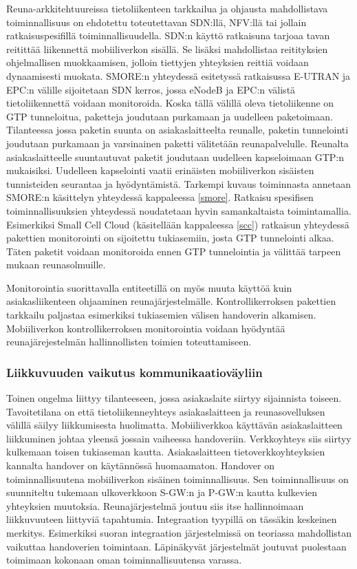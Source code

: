Reuna-arkkitehtuureissa tietoliikenteen tarkkailua ja ohjausta mahdollistava toiminnallisuus on ehdotettu toteutettavan SDN:llä, NFV:llä tai jollain ratkaisuspesifillä toiminnallisuudella. 
SDN:n käyttö ratkaisuna tarjoaa tavan reitittää liikennettä mobiiliverkon sisällä. Se lisäksi mahdollistaa reitityksien ohjelmallisen muokkaamisen, jolloin tiettyjen yhteyksien reittiä voidaan dynaamisesti muokata. SMORE:n yhteydessä esitetyssä ratkaisussa  E-UTRAN ja EPC:n välille sijoitetaan SDN kerros, jossa eNodeB ja EPC:n välistä tietoliikennettä voidaan monitoroida. 
Koska tällä välillä oleva tietoliikenne on GTP tunneloitua, paketteja joudutaan purkamaan ja uudelleen paketoimaan. 
Tilanteessa jossa paketin suunta on asiakaslaitteelta reunalle, paketin tunnelointi joudutaan purkamaan ja varsinainen paketti välitetään reunapalvelulle. 
Reunalta asiakaslaitteelle suuntautuvat paketit joudutaan uudelleen kapseloimaan GTP:n mukaisiksi.
Uudelleen kapselointi vaatii erinäisten mobiiliverkon sisäisten tunnisteiden seurantaa ja hyödyntämistä.
Tarkempi kuvaus toiminnasta annetaan SMORE:n käsittelyn yhteydessä kappaleessa \ref{smore}.
Ratkaisu spesifisen toiminnallisuuksien yhteydessä noudatetaan hyvin samankaltaista toimintamallia. Esimerkiksi Small Cell Cloud (käsitellään kappaleessa \ref{scc}) ratkaisun yhteydessä pakettien monitorointi on sijoitettu tukiasemiin, josta GTP tunnelointi alkaa.
Täten paketit voidaan monitoroida ennen GTP tunnelointia ja välittää tarpeen mukaan reunasolmuille.

Monitorointia suorittavalla entiteetillä on myös muuta käyttöä kuin asiakasliikenteen ohjaaminen reunajärjestelmälle.
Kontrollikerroksen pakettien tarkkailu paljastaa esimerkiksi tukiasemien välisen handoverin alkamisen.
Mobiiliverkon kontrollikerroksen monitorointia voidaan hyödyntää reunajärejestelmän hallinnollisten toimien toteuttamiseen.

\subsubsection*{Liikkuvuuden vaikutus kommunikaatioväyliin}

Toinen ongelma liittyy tilanteeseen, jossa asiakaslaite siirtyy sijainnista toiseen. Tavoitetilana on että tietoliikenneyhteys asiakaslaitteen ja reunasovelluksen välillä säilyy liikkumisesta huolimatta.
Mobiiliverkkoa käyttävän asiakaslaitteen liikkuminen johtaa yleensä jossain vaiheessa handoveriin.
Verkkoyhteys siis siirtyy kulkemaan toisen tukiaseman kautta. 
Asiakaslaitteen tietoverkkoyhteyksien kannalta handover on käytännössä huomaamaton.
Handover on toiminnallisuutena mobiiliverkon sisäinen toiminnallisuus.
Sen toiminnallisuus on suunniteltu tukemaan ulkoverkkoon S-GW:n ja P-GW:n kautta kulkevien yhteyksien muutoksia.
Reunajärjestelmä joutuu siis itse hallinnoimaan liikkuvuuteen liittyviä tapahtumia.
Integraation tyypillä on tässäkin keskeinen merkitys.
Esimerkiksi suoran integraation järjestelmissä on teoriassa mahdollistan vaikuttaa handoverien toimintaan.
Läpinäkyvät järjestelmät joutuvat puolestaan toimimaan kokonaan oman toiminnallisuutensa varassa.
 

